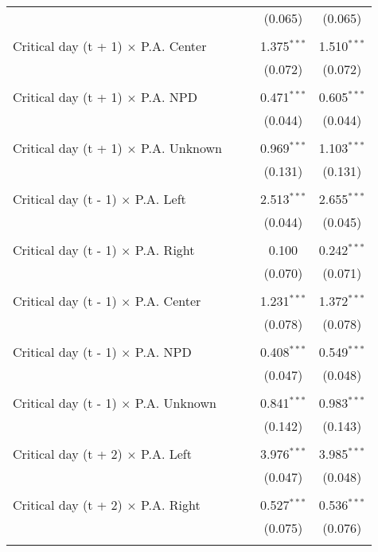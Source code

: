 \documentclass[
]{article}
\begin{document}
\begin{table}[!htbp]
{\begin{tabular}{@{\extracolsep{5pt}}lcccc}
  &  &  & (0.065) & (0.065) \\ 
  & & & & \\ 
 Critical day (t + 1) $\times$ P.A. Center &  &  & 1.375$^{***}$ & 1.510$^{***}$ \\ 
  &  &  & (0.072) & (0.072) \\ 
  & & & & \\ 
 Critical day (t + 1) $\times$ P.A. NPD &  &  & 0.471$^{***}$ & 0.605$^{***}$ \\ 
  &  &  & (0.044) & (0.044) \\ 
  & & & & \\ 
 Critical day (t + 1) $\times$ P.A. Unknown &  &  & 0.969$^{***}$ & 1.103$^{***}$ \\ 
  &  &  & (0.131) & (0.131) \\ 
  & & & & \\ 
 Critical day (t - 1) $\times$ P.A. Left &  &  & 2.513$^{***}$ & 2.655$^{***}$ \\ 
  &  &  & (0.044) & (0.045) \\ 
  & & & & \\ 
 Critical day (t - 1) $\times$ P.A. Right &  &  & 0.100 & 0.242$^{***}$ \\ 
  &  &  & (0.070) & (0.071) \\ 
  & & & & \\ 
 Critical day (t - 1) $\times$ P.A. Center &  &  & 1.231$^{***}$ & 1.372$^{***}$ \\ 
  &  &  & (0.078) & (0.078) \\ 
  & & & & \\ 
 Critical day (t - 1) $\times$ P.A. NPD &  &  & 0.408$^{***}$ & 0.549$^{***}$ \\ 
  &  &  & (0.047) & (0.048) \\ 
  & & & & \\ 
 Critical day (t - 1) $\times$ P.A. Unknown &  &  & 0.841$^{***}$ & 0.983$^{***}$ \\ 
  &  &  & (0.142) & (0.143) \\ 
  & & & & \\ 
 Critical day (t + 2) $\times$ P.A. Left &  &  & 3.976$^{***}$ & 3.985$^{***}$ \\ 
  &  &  & (0.047) & (0.048) \\ 
  & & & & \\ 
 Critical day (t + 2) $\times$ P.A. Right &  &  & 0.527$^{***}$ & 0.536$^{***}$ \\ 
  &  &  & (0.075) & (0.076) \\ 
  & & & & \\ 

\end{tabular}}
\end{table}
\end{document}
